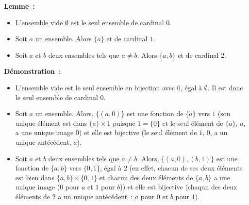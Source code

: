 \medskip

\noindent\textbf{Lemme :} 
    \begin{itemize}[nosep]
        \item L'ensemble vide $\emptyset$ est le seul ensemble de cardinal $0$.
        \item Soit $a$ un ensemble. 
            Alors $\lbrace a \rbrace$ et de cardinal $1$.
        \item Soit $a$ et $b$ deux ensembles tels que $a \neq b$. 
            Alors $\lbrace a, b \rbrace$ et de cardinal $2$.
    \end{itemize}

\medskip

\noindent\textbf{Démonstration :}

\begin{itemize}[nosep]
    \item L'ensemble vide est le seul ensemble en bijection avec $0$, égal à $\emptyset$. 
        Il est donc le seul ensemble de cardinal $0$.
    \item Soit $a$ un ensemble. 
        Alors, $\lbrace (a, 0) \rbrace$ est une fonction de $\lbrace a \rbrace$ vers $1$ (son unique élément est dans $\lbrace a \rbrace \times 1$ puisque $1 = \lbrace 0 \rbrace$ et le seul élément de $\lbrace a \rbrace$, $a$, a une unique image $0$) et elle est bijective (le seul élément de $1$, $0$, a un unique antécédent, $a$).
    \item Soit $a$ et $b$ deux ensembles tels que $a \neq b$.
        Alors, $\lbrace (a,0), (b,1) \rbrace$ est une fonction de $\lbrace a, b \rbrace$ vers $\lbrace 0, 1 \rbrace$, égal à $2$ (en effet, chacun de ses deux éléments est bien dans $\lbrace a, b \rbrace \times \lbrace 0, 1 \rbrace$ et chacun des deux éléments de $\lbrace a, b \rbrace$ a une unique image ($0$ pour $a$ et $1$ pour $b$)) et elle est bijective (chaqun des deux éléments de $2$ a un unique antécédent : $a$ pour $0$ et $b$ pour $1$).
\end{itemize}

\medskip

